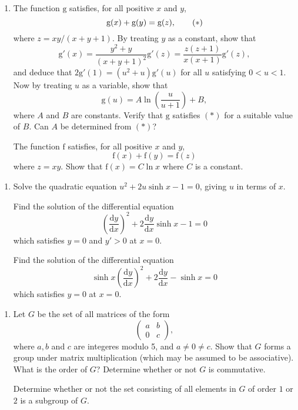 \documentclass[a4, 11pt]{report}
\newlength{\qspace}
\newcounter{qnumber}
\newenvironment{question}%
 {\vspace{\qspace}
  \begin{enumerate}[\bfseries 1\quad][10]%
    \setcounter{enumi}{\value{qnumber}}%
    \item%
 }
{
  \end{enumerate}
  \filbreak
  \stepcounter{qnumber}
 }
\begin{document}
	\begin{question}
		The function $\mathrm{g}$ satisfies, for all positive $x$ and $y$,
		\[
		\mathrm{g}(x)+\mathrm{g}(y)=\mathrm{g}(z),\tag{\ensuremath{*}}
		\]
		where $z=xy/(x+y+1).$ By treating $y$ as a constant, show that 
		\[
		\mathrm{g}'(x)=\frac{y^{2}+y}{(x+y+1)^{2}}\mathrm{g}'(z)=\frac{z(z+1)}{x(x+1)}\mathrm{g}'(z),
		\]
		and deduce that $2\mathrm{g}'(1)=(u^{2}+u)\mathrm{g}'(u)$ for all
		$u$ satisfying $0<u<1.$ Now by treating $u$ as a variable, show
		that 
		\[
		\mathrm{g}(u)=A\ln\left(\frac{u}{u+1}\right)+B,
		\]
		where $A$ and $B$ are constants. Verify that $\mathrm{g}$ satisfies
		$(*)$ for a suitable value of $B$. Can $A$ be determined from $(*)$? 


		The function $\mathrm{f}$ satisfies, for all positive $x$ and $y$,
		\[
		\mathrm{f}(x)+\mathrm{f}(y)=\mathrm{f}(z)
		\]
		where $z=xy.$ Show that $\mathrm{f}(x)=C\ln x$ where $C$ is a constant.
		\end{question}
		
	\begin{question}	
		Solve the quadratic equation $u^{2}+2u\sinh x-1=0$, giving $u$ in
		terms of $x$. 


		Find the solution of the differential equation 
		\[
		\left(\frac{\mathrm{d}y}{\mathrm{d}x}\right)^{2}+2\frac{\mathrm{d}y}{\mathrm{d}x}\sinh x-1=0
		\]
		which satisfies $y=0$ and $y'>0$ at $x=0$. 


		Find the solution of the differential equation 
		\[
		\sinh x\left(\frac{\mathrm{d}y}{\mathrm{d}x}\right)^{2}+2\frac{\mathrm{d}y}{\mathrm{d}x}-\sinh x=0
		\]
		which satisfies $y=0$ at $x=0$.
		\end{question}	
		
		\begin{question}
			Let $G$ be the set of all matrices of the form 
			\[
			\begin{pmatrix}a & b\\
			0 & c
			\end{pmatrix},
			\]
			where $a,b$ and $c$ are integeres modulo 5, and $a\neq0\neq c$.
			Show that $G$ forms a group under matrix multiplication (which may
			be assumed to be associative). What is the order of $G$? Determine
			whether or not $G$ is commutative. 


			Determine whether or not the set consisting of all elements in $G$
			of order $1$ or $2$ is a subgroup of $G$.
			\end{question}
			
\end{document}
